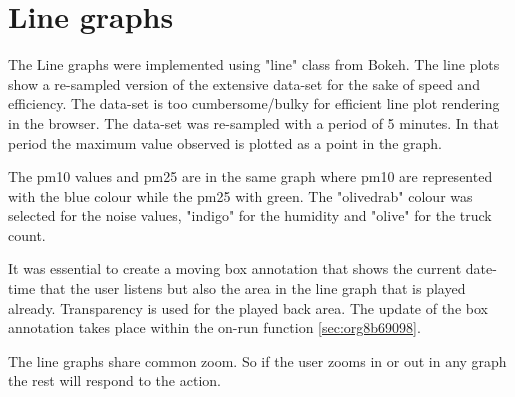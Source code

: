 \documentclass[11pt]{article}
\begin{document}
\section{Line graphs}
\label{sec:org44cef12}
The Line graphs were implemented using "line" class from Bokeh.  The line plots show a re-sampled version of the extensive data-set for the sake of speed and efficiency. The data-set is too cumbersome/bulky for efficient line plot rendering in the browser.  The data-set was re-sampled with a period of 5 minutes.  In that period the maximum value observed is plotted as a point in the graph.

The pm10 values and pm25 are in the same graph where pm10 are represented with the blue colour while the pm25 with green.  The "olivedrab" colour was selected for the noise values, "indigo" for the humidity and "olive" for the truck count.

It was essential to create a moving box annotation that shows the current date-time that the user listens but also the area in the line graph that is played already.   Transparency is used for the played back area.  The update of the box annotation takes place within the on-run function \ref{sec:org8b69098}.

The line graphs share common zoom.  So if the user zooms in or out in any graph the rest will respond to the action.
\end{document}
